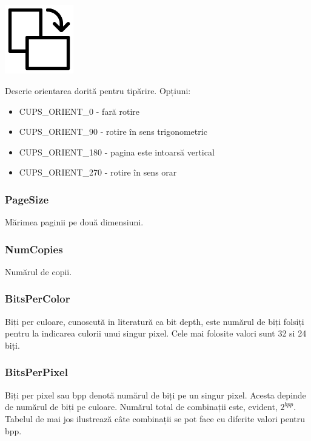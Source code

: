 \documentclass[a4paper, 12pt, twoside]{report}
\begin{document}
\begin{minipage}{0.3\textwidth}
\includegraphics[width=30mm]{orientation.png}
\end{minipage}
\begin{minipage}{0.6\textwidth}\raggedleft
Descrie orientarea dorită pentru tipărire. Opțiuni:
\begin{itemize}
\item CUPS\_ORIENT\_0 - fară rotire
\item CUPS\_ORIENT\_90 - rotire în sens trigonometric
\item CUPS\_ORIENT\_180 - pagina este intoarsă vertical
\item CUPS\_ORIENT\_270 - rotire în sens orar
\end{itemize}
\end{minipage}



			\subsubsection{PageSize}
Mărimea paginii pe două dimensiuni.

			\subsubsection{NumCopies}
Numărul de copii.

			\subsubsection{BitsPerColor}
Biți per culoare, cunoscută in literatură ca bit depth, este numărul de biți folsiți pentru la indicarea culorii unui singur pixel. Cele mai folosite valori sunt 32 si 24 biți.

			\subsubsection{BitsPerPixel}
Biți per pixel sau bpp denotă numărul de biți pe un singur pixel. Acesta depinde de numărul de biți pe culoare. Numărul total de combinații este, evident, \begin{math}2^{bpp}\end{math}. Tabelul de mai jos ilustrează câte combinații se pot face cu diferite valori pentru bpp.
\end{document}

